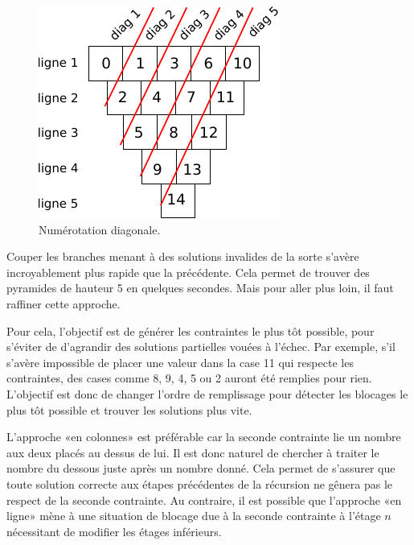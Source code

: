 \documentclass[10pt]{article}\usepackage[correction,nu]{esial}
\begin{document}
\begin{figure}
  \vspace{-.6\baselineskip}
  \centerline{\includegraphics[scale=.9]{img/numerotation-diagonales.pdf}}
  \vspace{-.5\baselineskip}
  \caption{Numérotation diagonale.}
  \label{fig:numdiag}
   \vspace{-1.5\baselineskip}
\end{figure}

Couper les branches menant à des solutions invalides de la sorte s'avère
incroyablement plus rapide que la précédente. Cela permet de trouver des
pyramides de hauteur 5 en quelques secondes. Mais pour aller plus loin, il faut
raffiner cette approche.

Pour cela, l'objectif est de générer les contraintes le plus tôt possible, pour
s'éviter de d'agrandir des solutions partielles vouées à l'échec. Par exemple,
s'il s'avère impossible de placer une valeur dans la case 11 qui respecte les
contraintes, des cases comme 8, 9, 4, 5 ou 2 auront été remplies pour
rien. L'objectif est donc de changer l'ordre de remplissage pour détecter les
blocages le plus tôt possible et trouver les solutions plus vite.

L'approche «en colonnes» est préférable car la seconde contrainte lie un nombre
aux deux placés au dessus de lui. Il est donc naturel de chercher à traiter le
nombre du dessous juste après un nombre donné. Cela permet de s'assurer que
toute solution correcte aux étapes précédentes de la récursion ne gênera pas le
respect de la seconde contrainte. Au contraire, il est possible que l'approche
«en ligne» mène à une situation de blocage due à la seconde contrainte à l'étage
$n$ nécessitant de modifier les étages inférieurs.
\end{document}
